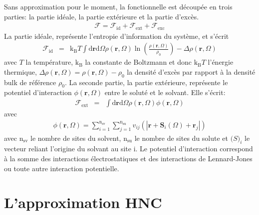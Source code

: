Sans approximation pour le moment, la fonctionnelle est découpée en trois parties: la partie idéale, la partie extérieure et la partie d'excès\cite{evans_density_2009,henderson_fundamentals_1992}. 
\begin{eqnarray}
\mathcal{F} = \mathcal{F}_\mathrm{id} + \mathcal{F}_\mathrm{ext} + \mathcal{F}_\mathrm{exc}
\label{eq:fonctionnelle}
\end{eqnarray}
La partie idéale, représente l’entropie d'information du système, et s'écrit
\begin{eqnarray}
\mathcal{F}_\mathrm{id}&=&\mathrm{k_B}T\int\mathrm{d}\boldsymbol{r}\mathrm{d}\Omega \rho\left(\boldsymbol{r},\Omega \right)\ln\left(\frac{\rho\left(\boldsymbol{r},\Omega \right)}{\rho_0}\right)-\Delta\rho\left(\boldsymbol{r},\Omega \right)
\label{eq:fonctionnelle:id}
\end{eqnarray}
\noindent avec $T$ la température, $\mathrm{k_B}$ la constante de Boltzmann et donc $\mathrm{k_B}T$ l'énergie thermique, $\Delta\rho\left(\boldsymbol{r},\Omega \right)=\rho\left(\boldsymbol{r},\Omega \right)-\rho_0$ la densité d'excès par rapport à la densité bulk de référence $\rho_0$. La seconde partie, la partie extérieure, représente le potentiel d'interaction $\phi\left(\boldsymbol{r},\Omega \right)$ entre le soluté et le solvant. Elle s'écrit:
\begin{eqnarray}
\mathcal{F}_\mathrm{ext}&=&\int\mathrm{d}\boldsymbol{r}\mathrm{d}\Omega\rho\left(\boldsymbol{r},\Omega \right)\phi\left(\boldsymbol{r},\Omega \right)
\label{eq:fonctionnelle:ext}
\end{eqnarray}
\noindent avec
\begin{eqnarray}
\phi\left(\boldsymbol{r},\Omega \right) = \sum\limits_{i=1}^{\mathrm{n}_\mathrm{sv}}\sum\limits_{j=1}^{\mathrm{n}_\mathrm{su}} v_{ij}(|\boldsymbol{r}+\boldsymbol{S}_i(\Omega)+\boldsymbol{r}_j|)
\end{eqnarray}
\noindent avec $\mathrm{n}_\mathrm{sv}$ le nombre de sites du solvent, $\mathrm{n}_\mathrm{su}$ le nombre de sites du solute et $\boldsymbol(S)_i$ le vecteur reliant l'origine du solvant au site i. Le potentiel d'interaction correspond à la somme des interactions électrostatiques et des interactions de Lennard-Jones ou toute autre interaction potentielle. 

\section{L'approximation HNC}

